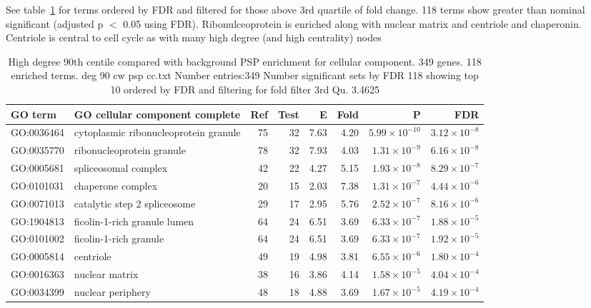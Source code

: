 See table~\ref{tab:deg 90 cw psp cc.txt Number entries:349 Number significant sets by FDR 118 showing top 10 ordered by FDR and filtering for fold filter 3rd Qu. 3.4625} for terms ordered by FDR and filtered for those above 3rd quartile of fold change. 118 terms show greater than nominal significant (adjusted p $<$ 0.05 using FDR). Ribonulceoprotein is enriched along with nuclear matrix and centriole and chaperonin. Centriole is central to cell cycle as with many high degree (and high centrality) nodes
\begin{table}[ht]
\centering
\begin{adjustbox}{width=\textwidth}

\begin{tabular}{llrrrrrr}
  \hline
GO term & GO cellular component complete & Ref & Test & E & Fold & P & FDR \\ 
  \hline
GO:0036464 & cytoplasmic ribonucleoprotein granule  & 75 & 32 & 7.63 & 4.20 & $5.99 \times 10^{-10}$ & $3.12 \times 10^{-8}$ \\ 
  GO:0035770 & ribonucleoprotein granule  & 78 & 32 & 7.93 & 4.03 & $1.31 \times 10^{-9}$ & $6.16 \times 10^{-8}$ \\ 
  GO:0005681 & spliceosomal complex  & 42 & 22 & 4.27 & 5.15 & $1.93 \times 10^{-8}$ & $8.29 \times 10^{-7}$ \\ 
  GO:0101031 & chaperone complex  & 20 & 15 & 2.03 & 7.38 & $1.31 \times 10^{-7}$ & $4.44 \times 10^{-6}$ \\ 
  GO:0071013 & catalytic step 2 spliceosome  & 29 & 17 & 2.95 & 5.76 & $2.52 \times 10^{-7}$ & $8.16 \times 10^{-6}$ \\ 
  GO:1904813 & ficolin-1-rich granule lumen  & 64 & 24 & 6.51 & 3.69 & $6.33 \times 10^{-7}$ & $1.88 \times 10^{-5}$ \\ 
  GO:0101002 & ficolin-1-rich granule  & 64 & 24 & 6.51 & 3.69 & $6.33 \times 10^{-7}$ & $1.92 \times 10^{-5}$ \\ 
  GO:0005814 & centriole  & 49 & 19 & 4.98 & 3.81 & $6.55 \times 10^{-6}$ & $1.80 \times 10^{-4}$ \\ 
  GO:0016363 & nuclear matrix  & 38 & 16 & 3.86 & 4.14 & $1.58 \times 10^{-5}$ & $4.04 \times 10^{-4}$ \\ 
  GO:0034399 & nuclear periphery  & 48 & 18 & 4.88 & 3.69 & $1.67 \times 10^{-5}$ & $4.19 \times 10^{-4}$ \\ 
  \hline
\end{tabular}
\end{adjustbox}
\caption{High degree 90th centile compared with background PSP enrichment for cellular component. 349 genes. 118 enriched terms. deg 90 cw psp cc.txt Number entries:349 Number significant sets by FDR 118 showing top 10 ordered by FDR and filtering for fold filter 3rd Qu. 3.4625} 
\label{tab:deg 90 cw psp cc.txt Number entries:349 Number significant sets by FDR 118 showing top 10 ordered by FDR and filtering for fold filter 3rd Qu. 3.4625}
\end{table}
